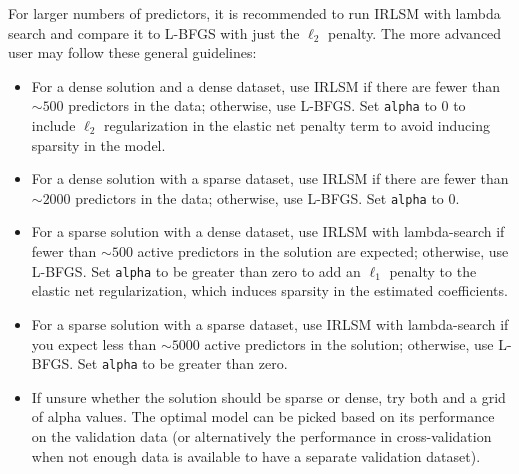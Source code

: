 For larger numbers of predictors, it is recommended to run IRLSM with lambda search and compare it to L-BFGS with just the $\ell_2$ penalty. The more advanced user may follow these general guidelines:
\begin{itemize}
\item For a dense solution and a dense dataset, use IRLSM if there are fewer than $\sim 500$ predictors in the data; otherwise, use L-BFGS. Set \texttt{alpha} to 0 to include $\ell_2$ regularization in the elastic net penalty term to avoid inducing sparsity in the model.
\item For a dense solution with a sparse dataset, use IRLSM if there are fewer than $\sim 2000$ predictors in the data; otherwise, use L-BFGS. Set \texttt{alpha} to 0.
\item For a sparse solution with a dense dataset, use IRLSM with lambda-search if fewer than $\sim 500$ active predictors in the solution are expected; otherwise, use L-BFGS. Set \texttt{alpha} to be greater than zero to add an $\ell_1$ penalty to the elastic net regularization, which induces sparsity in the estimated coefficients. 
\item For a sparse solution with a sparse dataset, use IRLSM with lambda-search if you expect less than $\sim 5000$ active predictors in the solution; otherwise, use L-BFGS. Set \texttt{alpha} to be greater than zero. 
\item If unsure whether the solution should be sparse or dense, try both and a grid of alpha values. The optimal model can be picked based on its performance on the validation data (or alternatively the performance in cross-validation when not enough data is available to have a separate validation dataset).      
\end{itemize}

